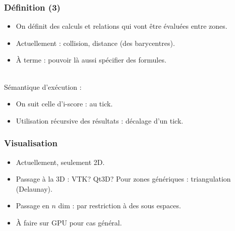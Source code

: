 \documentclass{beamer}
\begin{document}
\begin{frame}
    \frametitle{Définition (3)}\Large
    \begin{itemize}
        \item On définit des calculs et relations qui vont être évaluées entre zones.
        \item Actuellement : collision, distance (des barycentres). 
        \item À terme : pouvoir là aussi spécifier des formules.
    \end{itemize}
    ~\\
    Sémantique d'exécution : 
    \begin{itemize}
        \item On suit celle d'i-score : au tick.
        \item Utilisation récursive des résultats : décalage d'un tick.
    \end{itemize}
\end{frame}

    

\begin{frame}
    \frametitle{Visualisation}
    \Large
    \begin{itemize}
        \item Actuellement, seulement 2D.
        \item Passage à la 3D : VTK? Qt3D?
        Pour zones génériques : triangulation (Delaunay).
        \item Passage en $n$ dim : par restriction à des sous espaces.
        \item À faire sur GPU pour cas général.
    \end{itemize}
\end{frame}
\end{document}
